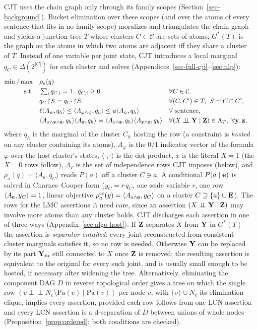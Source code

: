 \documentclass{article} %
\newenvironment{revblock}{\color{blue}}{}
\newcommand{\indep}{\perp\!\!\!\perp}
\newcommand{\restr}{\!\restriction\!}
\newcommand{\readoff}{\rho}
\providecommand{\Pa}{\mathrm{Pa}}
\providecommand{\readoffcc}{\readoff^{\mathrm{cc}}}
\begin{document}
\begin{revblock}
CJT uses the chain graph only through its family scopes
(Section~\ref{sec-background}). Bucket elimination over these scopes (and over
the atoms of every sentence that fits in no family scope) moralizes and
triangulates the chain graph and yields a junction tree $T$ whose clusters
$C\in\mathcal{C}$ are sets of atoms; $G^\ast(T)$ is the graph on the atoms in
which two atoms are adjacent iff they share a cluster of $T$. Instead of one
variable per joint state, CJT introduces a local marginal
$q_C\in\Delta(2^{|C|})$ for each cluster and solves (Appendices~\ref{sec-full-cjt}--\ref{sec:nlp}):
\[
\begin{aligned}
\min/\max\quad & \readoff_a(q)\\
\text{s.t.}\quad
&\textstyle\sum_i q_{C,i}=1,\ q_{C,i}\ge0 && \forall C\in\mathcal C,\\
&q_C\restr S=q_{C'}\restr S && \forall (C,C')\in T,\ S=C\cap C',\\
&\ell\langle A_{\psi},q_{h}\rangle\le\langle A_{\varphi\wedge\psi},q_{h}\rangle
   \le u\langle A_{\psi},q_{h}\rangle && \forall\text{ sentence},\\
&\langle A_{x\wedge\by\wedge\bz},q_{h}\rangle\langle A_{\bz},q_{h}\rangle=\langle A_{x\wedge\bz},q_{h}\rangle\langle A_{\by\wedge\bz},q_{h}\rangle
   && \forall (X\indep\bY\mid\bZ)\in\Lambda_T,\ \forall\by,\bz,
\end{aligned}
\]
where $q_h$ is the marginal of the cluster $C_h$ hosting the row (a constraint is
\emph{hosted} on any cluster containing its atoms),
$A_\varphi$ is the $0/1$ indicator vector of the formula $\varphi$ over the host
cluster's states, $\langle\cdot,\cdot\rangle$ is the dot product, $x$ is the
literal $X{=}1$ (the $X{=}0$ rows follow), $\Lambda_T$ is the set of independence
rows CJT imposes (below), and $\readoff_a(q)=\langle A_a,q_C\rangle$ reads $P(a)$
off a cluster $C\ni a$. A conditional $P(a\mid \mathbf{e})$ is solved in
Charnes--Cooper form ($y_C=r\,q_C$, one scale variable $r$, one row
$\langle A_{\mathbf{e}},y_C\rangle=1$, linear objective
$\readoffcc_a(y)=\langle A_{a\wedge\be},y_C\rangle$ on a cluster $C\supseteq\{a\}\cup\mathbf{E}$).
The rows for the LMC assertions $\Lambda$ need care, since an assertion
$(X\indep\bY\mid\bZ)$ may involve more atoms than any cluster holds. CJT
discharges each assertion in one of three ways (Appendix~\ref{sec:algo-host}).
If $\mathbf{Z}$ separates $X$ from $\mathbf{Y}$ in $G^\ast(T)$ the assertion is
\emph{separator-entailed}: every joint reconstructed from consistent cluster
marginals satisfies it, so no row is needed. Otherwise $\mathbf{Y}$ can be replaced by
its part $\mathbf{Y}_{\mathrm{in}}$ still connected to $X$ once $\mathbf{Z}$ is removed; the
resulting assertion is equivalent to the original for every such joint, and is
usually small enough to be hosted, if necessary after widening the tree.
Alternatively, eliminating the component DAG $D$ in reverse topological order
gives a tree on which the single row $(v\indep N_v\setminus\Pa(v)\mid\Pa(v))$ per
node $v$, with $\{v\}\cup N_v$ its elimination clique, implies every assertion,
provided each row follows from one LCN assertion and every LCN assertion is a
d-separation of $D$ between unions of whole nodes
(Proposition~\ref{prop:ordered}; both conditions are checked).


\end{revblock}
\end{document}
